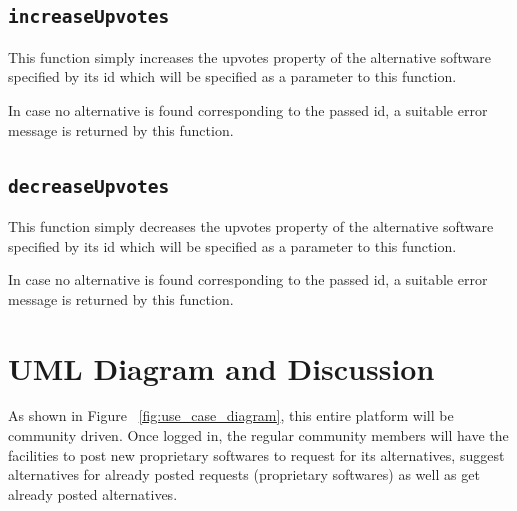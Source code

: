 \subsection{\texttt{increaseUpvotes}}
This function simply increases the upvotes property of the alternative software specified by its id which will be specified as a parameter to this function.

In case no alternative is found corresponding to the passed id, a suitable error message is returned by this function.

\subsection{\texttt{decreaseUpvotes}}
This function simply decreases the upvotes property of the alternative software specified by its id which will be specified as a parameter to this function.

In case no alternative is found corresponding to the passed id, a suitable error message is returned by this function.

\pagebreak


\section{UML Diagram and Discussion}


As shown in Figure ~\ref{fig:use_case_diagram}, this entire platform will be community driven. Once logged in, the regular community members will have the facilities to post new proprietary softwares to request for its alternatives, suggest alternatives for already posted requests (proprietary softwares) as well as get already posted alternatives.

